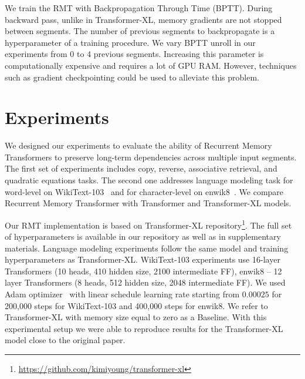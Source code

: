   We train the RMT with Backpropagation Through Time (BPTT). During backward pass, unlike in Transformer-XL, memory gradients are not stopped between segments. The number of previous segments to backpropagate is a hyperparameter of a training procedure. We vary BPTT unroll in our experiments from 0 to 4 previous segments. Increasing this parameter is computationally expensive and requires a lot of GPU RAM. However, techniques such as gradient checkpointing could be used to alleviate this problem.
  
  
  \section{Experiments}
  \label{sec:experiments}
  
  We designed our experiments to evaluate the ability of Recurrent Memory Transformers to preserve long-term dependencies across multiple input segments. The first set of experiments includes copy, reverse, associative retrieval, and quadratic equations tasks. The second one addresses language modeling task for word-level on WikiText-103~\cite{merity2017wikitext} and for character-level on enwik8~\cite{enwik8}. We compare Recurrent Memory Transformer with Transformer and Transformer-XL models.
  
  Our RMT implementation is based on Transformer-XL repository\footnote{\url{https://github.com/kimiyoung/transformer-xl}}. 
  The full set of hyperparameters is available in our repository as well as in supplementary materials. Language modeling experiments follow the same model and training hyperparameters as Transformer-XL. WikiText-103 experiments use 16-layer Transformers (10 heads, 410 hidden size, 2100 intermediate FF), enwik8 -- 12 layer Transformers (8 heads, 512 hidden size, 2048 intermediate FF). We used Adam optimizer~\cite{adam} with linear schedule learning rate starting from $0.00025$ for 200,000 steps for WikiText-103 and 400,000 steps for enwik8. We refer to Transformer-XL with memory size equal to zero as a Baseline.
  With this experimental setup we were able to reproduce  results for the Transformer-XL model close to the original paper.%
  
